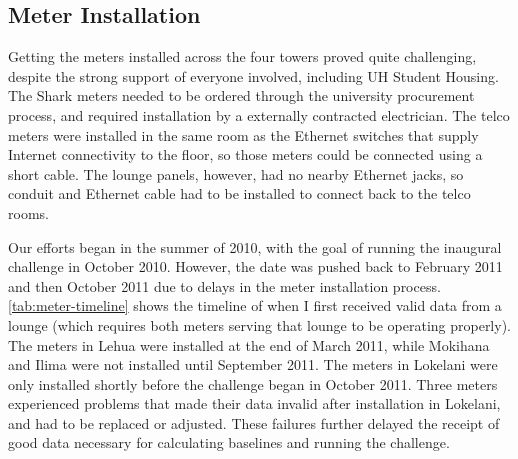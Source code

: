 \subsection{Meter Installation}
\label{sec:meter-installation}

Getting the meters installed across the four towers proved quite challenging, despite the strong support of everyone involved, including UH \Manoa Student Housing. The Shark meters needed to be ordered through the university procurement process, and required installation by a externally contracted electrician. The telco meters were installed in the same room as the Ethernet switches that supply Internet connectivity to the floor, so those meters could be connected using a short cable. The lounge panels, however, had no nearby Ethernet jacks, so conduit and Ethernet cable had to be installed to connect back to the telco rooms.

Our efforts began in the summer of 2010, with the goal of running the inaugural challenge in October 2010. However, the date was pushed back to February 2011 and then October 2011 due to delays in the meter installation process. \autoref{tab:meter-timeline} shows the timeline of when I first received valid data from a lounge (which requires both meters serving that lounge to be operating properly). The meters in Lehua were installed at the end of March 2011, while Mokihana and Ilima were not installed until September 2011. The meters in Lokelani were only installed shortly before the challenge began in October 2011. Three meters experienced problems that made their data invalid after installation in Lokelani, and had to be replaced or adjusted. These failures further delayed the receipt of good data necessary for calculating baselines and running the challenge.

